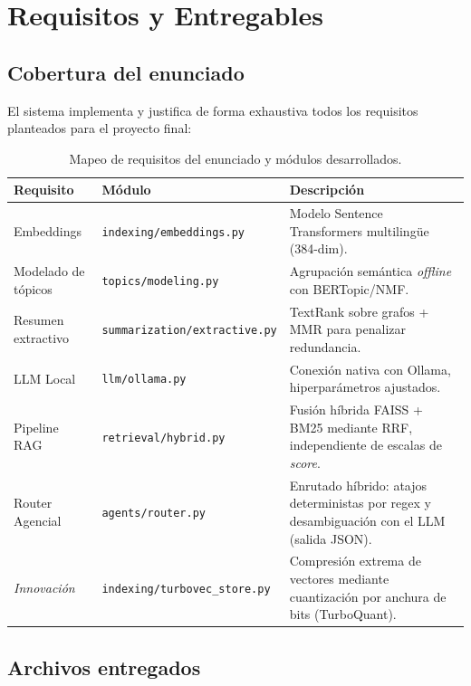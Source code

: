 \documentclass[11pt,a4paper]{article}
\newcommand{\code}[1]{\texttt{#1}}
\begin{document}
\section{Requisitos y Entregables}

\subsection{Cobertura del enunciado}

El sistema implementa y justifica de forma exhaustiva todos los requisitos planteados para el proyecto final:

\begin{table}[htbp]
\centering
\small
{}
\begin{tabularx}{\textwidth}{l l X}
\toprule
\rowcolor{tabheader} \textbf{Requisito} & \textbf{Módulo} & \textbf{Descripción} \\
\midrule
Embeddings & \code{indexing/embeddings.py} & Modelo Sentence Transformers multilingüe (384-dim). \\
Modelado de tópicos & \code{topics/modeling.py} & Agrupación semántica \textit{offline} con BERTopic/NMF. \\
Resumen extractivo & \code{summarization/extractive.py} & TextRank sobre grafos + MMR para penalizar redundancia. \\
LLM Local & \code{llm/ollama.py} & Conexión nativa con Ollama, hiperparámetros ajustados. \\
Pipeline RAG & \code{retrieval/hybrid.py} & Fusión híbrida FAISS + BM25 mediante RRF, independiente de escalas de \textit{score}. \\
Router Agencial & \code{agents/router.py} & Enrutado híbrido: atajos deterministas por regex y desambiguación con el LLM (salida JSON). \\
\midrule
\textit{Innovación} & \code{indexing/turbovec\_store.py} & Compresión extrema de vectores mediante cuantización por anchura de bits (TurboQuant). \\
\bottomrule
\end{tabularx}
\caption{Mapeo de requisitos del enunciado y módulos desarrollados.}
\end{table}

\newpage
\subsection{Archivos entregados}
\end{document}

